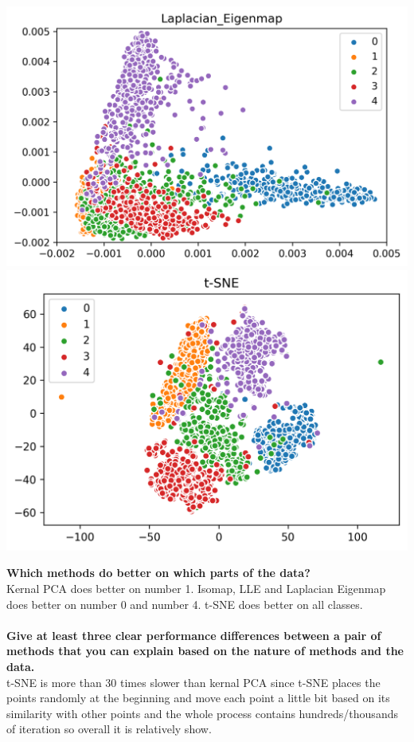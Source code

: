 \documentclass[12pt]{article}
\begin{document}
\begin{center}
    \includegraphics[width=15cm]{../plots/Q3_Laplacian_Eigenmap.png}
    \includegraphics[width=15cm]{../plots/Q3_t-SNE.png}
\end{center}
\noindent
\textbf{Which methods do better on which parts of the data?}\\
Kernal PCA does better on number 1. Isomap, LLE and Laplacian Eigenmap does better on number 0 and number 4. t-SNE does better on all classes.\\\\
\textbf{Give at least three clear performance differences between a pair of methods that you can explain based on the nature of methods and the data.}\\
t-SNE is more than 30 times slower than kernal PCA since t-SNE places the points randomly at the beginning and move each point a little bit based on its similarity with other points and the whole process contains hundreds/thousands of iteration so overall it is relatively show.\\\\
\end{document}
